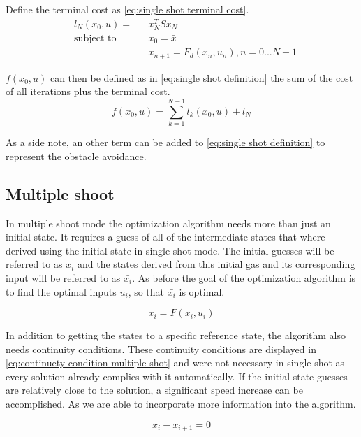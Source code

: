 			Define the terminal cost as \eqref{eq:single shot terminal cost}.
			\begin{equation}
			\begin{aligned}
			& l_N(x_0,u) = && x_N^TSx_N \\
			& \text{subject to}			&& x_0 = \bar{x} \\
			& 							&&  x_{n+1} = F_d(x_n,u_n), n=0...N-1
			\end{aligned}
			\label{eq:single shot terminal cost}
			\end{equation}
			
			$f(x_0,u)$ can then be defined as in \eqref{eq:single shot definition} the sum of the cost of all iterations plus the terminal cost.
			\begin{equation}
				f(x_0,u) = \sum_{k=1}^{N-1} l_k(x_0,u) + l_N
				\label{eq:single shot definition}
			\end{equation}
			
			As a side note, an other term can be added to \eqref{eq:single shot definition} to represent the obstacle avoidance.
		\subsection{Multiple shoot}
			In multiple shoot mode the optimization algorithm needs more than just an initial state. It requires a guess of all of the intermediate states that where derived using the initial state in  single shot mode. The initial guesses will be referred to as $x_i$ and the states derived from this initial gas and its corresponding input will be referred to as $\bar{x_i}$. As before the goal of the optimization algorithm is to find the optimal inputs $u_i$, so that $\bar{x_i}$ is optimal.
			
			\begin{equation}
				\bar{x_i} = F(x_i,u_i)
				\label{eq:}
			\end{equation}
			
			In addition to getting the states to a specific reference state, the algorithm also needs continuity conditions. These continuity conditions are displayed in \eqref{eq:continuety condition multiple shot} and were not necessary in single shot as every solution already complies with it automatically. If the initial state guesses are relatively close to the solution, a significant speed increase can be accomplished. As we are able to incorporate more information into the algorithm.
			
			\begin{equation}
				\bar{x_i} - x_{i+1} = 0
				\label{eq:continuety condition multiple shot}
			\end{equation}
			
